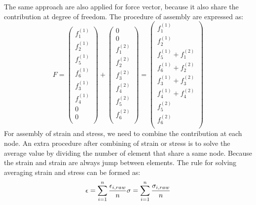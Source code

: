 The same approach are also applied for force vector, because it also share the contribution at degree of freedom. The procedure of assembly are expressed as:
\begin{equation}
F =  \begin{pmatrix}
f_1^{\left(1\right)} \\
f_2^{\left(1\right)} \\
f_5^{\left(1\right)} \\ 
f_6^{\left(1\right)} \\ 
f_3^{\left(1\right)} \\
f_4^{\left(1\right)} \\
0 \\ 
0 \\ 
\end{pmatrix} +  \begin{pmatrix}
0 \\ 
0 \\ 
f_1^{\left(2\right)} \\
f_2^{\left(2\right)} \\
f_3^{\left(2\right)} \\ 
f_4^{\left(2\right)} \\ 
f_5^{\left(2\right)} \\
f_6^{\left(2\right)} \\
\end{pmatrix} = \begin{pmatrix}
f_1^{\left(1\right)} \\
f_2^{\left(1\right)} \\
f_5^{\left(1\right)}+ f_1^{\left(2\right)} \\ 
f_6^{\left(1\right)}+ f_2^{\left(2\right)} \\ 
f_3^{\left(1\right)}+ f_3^{\left(2\right)}\\
f_4^{\left(1\right)}+ f_4^{\left(2\right)} \\
f_5^{\left(2\right)} \\ 
f_6^{\left(2\right)}  \\ 
\end{pmatrix} 
\end{equation}
For assembly of strain and stress, we need to combine the contribution at each node. An extra procedure after combining of strain or stress is to solve the average value by dividing the number of element that share a same node. Because the strain and strain are always jump between elements. The rule for solving averaging strain and stress can be formed as:
\begin{equation}
\epsilon = \displaystyle\sum_{i=1}^{n} \frac{\epsilon_{i,raw}}{n}
\\
\sigma = \displaystyle\sum_{i=1}^{n} \frac{\sigma_{i,raw}}{n}
\end{equation} 



